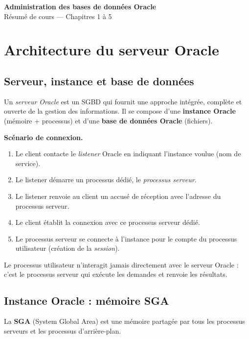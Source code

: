 \documentclass[11pt,a4paper]{article}
\begin{document}
\begin{center}
{\LARGE\bfseries Administration des bases de données Oracle}\\[6pt]
{\large Résumé de cours --- Chapitres 1 à 5}
\end{center}
\vspace{2pt}
\tableofcontents
\vspace{4pt}

\section{Architecture du serveur Oracle}

\subsection{Serveur, instance et base de données}
\begin{definition}
Un \emph{serveur Oracle} est un SGBD qui fournit une approche intégrée, complète et ouverte de la gestion des informations. Il se compose d'une \textbf{instance Oracle} (mémoire + processus) et d'une \textbf{base de données Oracle} (fichiers).
\end{definition}

\textbf{Scénario de connexion.}
\begin{enumerate}[nosep]
\item Le client contacte le \emph{listener} Oracle en indiquant l'instance voulue (nom de service).
\item Le listener démarre un processus dédié, le \emph{processus serveur}.
\item Le listener renvoie au client un accusé de réception avec l'adresse du processus serveur.
\item Le client établit la connexion avec ce processus serveur dédié.
\item Le processus serveur se connecte à l'instance pour le compte du processus utilisateur (création de la \emph{session}).
\end{enumerate}
Le processus utilisateur n'interagit jamais directement avec le serveur Oracle : c'est le processus serveur qui exécute les demandes et renvoie les résultats.

\subsection{Instance Oracle : mémoire SGA}
La \textbf{SGA} (System Global Area) est une mémoire partagée par tous les processus serveurs et les processus d'arrière-plan.
\end{document}

